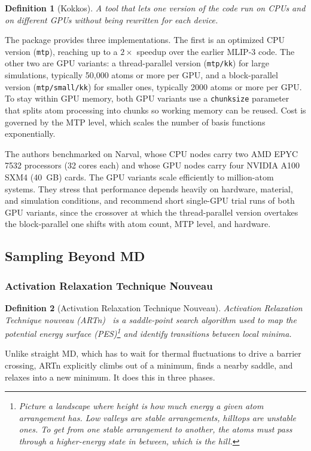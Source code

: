 \documentclass{article}
\newtheorem{definition}{Definition}
\begin{document}
\begin{definition}[Kokkos]
    A tool that lets one version of the code run on CPUs and on different GPUs without being rewritten for each device.
\end{definition}

The package provides three implementations. The first is an optimized CPU version (\texttt{mtp}), reaching up to a $2\times$ speedup over the earlier MLIP-3 code. The other two are GPU variants: a thread-parallel version (\texttt{mtp/kk}) for large simulations, typically 50{,}000 atoms or more per GPU, and a block-parallel version (\texttt{mtp/small/kk}) for smaller ones, typically 2000 atoms or more per GPU. To stay within GPU memory, both GPU variants use a \texttt{chunksize} parameter that splits atom processing into chunks so working memory can be reused. Cost is governed by the MTP level, which scales the number of basis functions exponentially.

The authors benchmarked on Narval, whose CPU nodes carry two AMD EPYC 7532 processors (32 cores each) and whose GPU nodes carry four NVIDIA A100 SXM4 (40~GB) cards. The GPU variants scale efficiently to million-atom systems. They stress that performance depends heavily on hardware, material, and simulation conditions, and recommend short single-GPU trial runs of both GPU variants, since the crossover at which the thread-parallel version overtakes the block-parallel one shifts with atom count, MTP level, and hardware.

\subsection{Sampling Beyond MD}
\subsubsection{Activation Relaxation Technique Nouveau}
\begin{definition}[Activation Relaxation Technique Nouveau]
    Activation Relaxation Technique nouveau (ARTn)~\cite{barkema1996} is a saddle-point search algorithm used to map the potential energy surface (PES)\footnote{Picture a landscape where height is how much energy a given atom arrangement has. Low valleys are stable arrangements, hilltops are unstable ones. To get from one stable arrangement to another, the atoms must pass through a higher-energy state in between, which is the hill.} and identify transitions between local minima.
\end{definition}
Unlike straight MD, which has to wait for thermal fluctuations to drive a barrier crossing, ARTn explicitly climbs out of a minimum, finds a nearby saddle, and relaxes into a new minimum. It does this in three phases.
\end{document}
